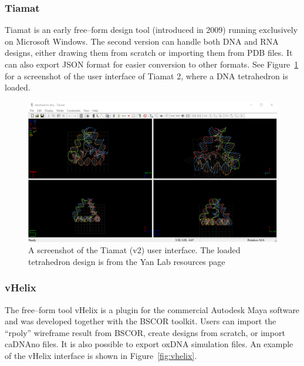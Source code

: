 \subsubsection{Tiamat}
\label{sec:tiamat}
Tiamat is an early free--form design tool (introduced in 2009) \cite{Tiamat} running exclusively on Microsoft Windows. The second version can handle both DNA and RNA designs, either drawing them from scratch or importing them from PDB files. It can also export JSON format for easier conversion to other formats. See Figure~\ref{fig:tiamat} for a screenshot of the user interface of Tiamat 2, where a DNA tetrahedron is loaded.

\begin{figure}[ht]
  \begin{center}
    \includegraphics[width=\textwidth]{figures/tiamat_ui.png}
    \caption{A screenshot of the Tiamat \cite{Tiamat} (v2) user interface. The loaded tetrahedron design is from the Yan Lab resources page \cite{tiamatWeb}}
    \label{fig:tiamat}
  \end{center}
\end{figure}

\subsubsection{vHelix}
\label{sec:vhelix}
The free--form tool vHelix \cite{vHelix} is a plugin for the commercial Autodesk Maya software \cite{maya} and was developed together with the BSCOR toolkit. Users can import the ``rpoly'' wireframe result from BSCOR, create designs from scratch, or import caDNAno files. It is also possible to export oxDNA simulation files. An example of the vHelix interface is shown in Figure~\ref{fig:vhelix}. 

